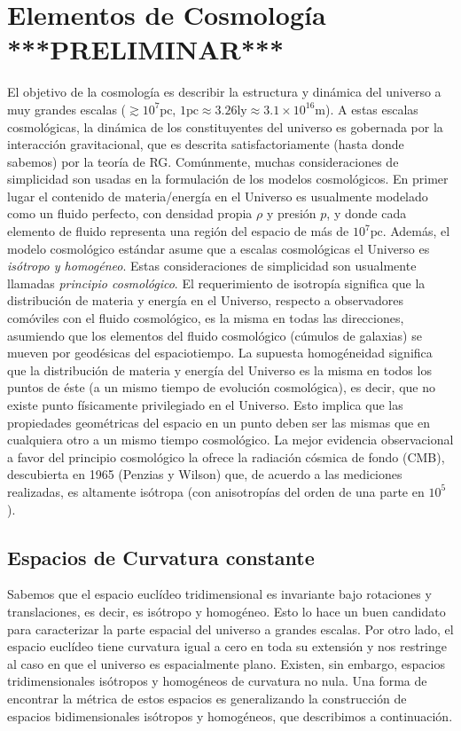 \chapter{Elementos de Cosmología ***PRELIMINAR***}\label{cap:cosmo}
El objetivo de la cosmología es describir la estructura y dinámica del universo a muy grandes escalas ($\gtrsim 10^{7}\text{pc}$, $1\text{pc}\approx 3.26\text{ly}\approx 3.1\times 10^{16}\text{m}$). A estas escalas cosmológicas, la dinámica de los constituyentes del universo es gobernada por la interacción gravitacional, que es descrita satisfactoriamente (hasta donde sabemos) por la teoría de RG.
Comúnmente, muchas consideraciones de simplicidad son usadas en la formulación de los modelos cosmológicos. 
En primer lugar el contenido de materia/energía en el Universo es usualmente modelado como un fluido perfecto, 
con densidad propia $\rho$ y presión $p$, y donde cada elemento de fluido representa una región del espacio de más de $10^{7}\text{pc}$. Además, el modelo cosmológico estándar asume que a escalas cosmológicas el Universo es \textit{isótropo y homogéneo}. Estas consideraciones de simplicidad son usualmente llamadas \textit{principio cosmológico}. El requerimiento de isotropía significa que la distribución de materia y energía en el Universo, respecto a observadores comóviles con el fluido cosmológico, es la misma en todas las direcciones, asumiendo que los elementos del fluido cosmológico (cúmulos de galaxias) se mueven por geodésicas del espaciotiempo.
La supuesta homogéneidad significa que la distribución de materia y energía del Universo es la misma en todos los puntos de éste (a un mismo tiempo de evolución cosmológica), es decir, que no existe punto físicamente privilegiado en el 
Universo. Esto implica que las propiedades geométricas del espacio en un punto deben ser las mismas que en cualquiera otro a un mismo tiempo cosmológico.
La mejor evidencia observacional a favor del principio cosmológico la ofrece la radiación cósmica de fondo (CMB), descubierta en 1965 (Penzias y Wilson) que, de acuerdo a las mediciones realizadas, es altamente isótropa (con anisotropías del orden de una parte en $10^5$).
\section{Espacios de Curvatura constante}
Sabemos que el espacio euclídeo tridimensional es invariante bajo rotaciones y translaciones, es decir, es isótropo y homogéneo. Esto lo hace un buen candidato para caracterizar la parte espacial del universo a grandes escalas. Por otro lado, el espacio euclídeo tiene curvatura igual a cero en toda su extensión y nos restringe al caso en que el universo es espacialmente plano. Existen, sin embargo, espacios tridimensionales isótropos y homogéneos de curvatura no nula. Una forma de encontrar la métrica de estos espacios es generalizando la construcción de espacios bidimensionales isótropos y homogéneos, que describimos a continuación.

